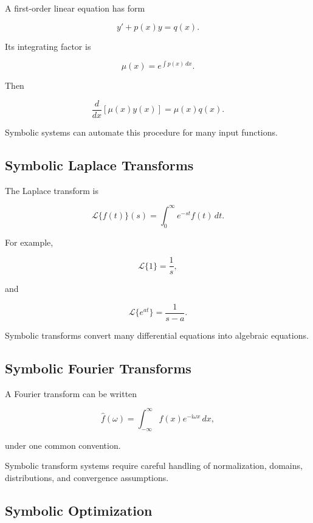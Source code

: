 A first-order linear equation has form

\[
\boxed{
y'
+
p(x)y
=
q(x).
}
\]

Its integrating factor is

\[
\boxed{
\mu(x)
=
e^{\int p(x)\,dx}.
}
\]

Then

\[
\boxed{
\frac{d}{dx}
[
\mu(x)y(x)
]
=
\mu(x)q(x).
}
\]

Symbolic systems can automate this procedure for many input functions.

\subsection{Symbolic Laplace Transforms}
\label{subsec:symbolic-laplace-transforms}

The Laplace transform is

\[
\boxed{
\mathcal{L}\{f(t)\}(s)
=
\int_0^\infty
e^{-st}f(t)\,dt.
}
\]

For example,

\[
\boxed{
\mathcal{L}\{1\}
=
\frac1s,
}
\]

and

\[
\boxed{
\mathcal{L}\{e^{at}\}
=
\frac1{s-a}.
}
\]

Symbolic transforms convert many differential equations into algebraic
equations.

\subsection{Symbolic Fourier Transforms}
\label{subsec:symbolic-fourier-transforms}

A Fourier transform can be written

\[
\boxed{
\widehat{f}(\omega)
=
\int_{-\infty}^{\infty}
f(x)e^{-\mathrm{i}\omega x}\,dx,
}
\]

under one common convention.

Symbolic transform systems require careful handling of normalization,
domains, distributions, and convergence assumptions.

\subsection{Symbolic Optimization}
\label{subsec:symbolic-optimization}

